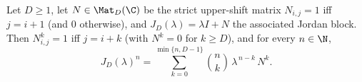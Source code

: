 \begin{lemma}
    \label{lem:jordan_block_power}
    \uses{}
    Let $D\ge 1$, let $N\in\Mat_{D}(\C)$ be the strict upper-shift matrix
    $N_{i,j}=1$ iff $j=i+1$ (and $0$ otherwise), and
    $J_{D}(\lambda)=\lambda I+N$ the associated Jordan block.
    Then $N^{k}_{i,j}=1$ iff $j=i+k$ (with $N^{k}=0$ for $k\ge D$), and for
    every $n\in\N$,
    \[
    J_{D}(\lambda)^{n}=
      \sum_{k=0}^{\min\{n,D-1\}}
        \binom{n}{k}\,\lambda^{\,n-k}\,N^{k}.
    \]
\end{lemma}
